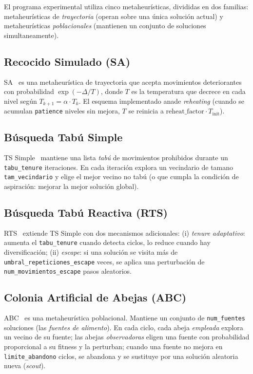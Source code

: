 El programa experimental utiliza cinco metaheurísticas, divididas en dos
familias: metaheurísticas de \emph{trayectoria} (operan sobre una única
solución actual) y metaheurísticas \emph{poblacionales} (mantienen un
conjunto de soluciones simultaneamente).

\subsection{Recocido Simulado (SA)}

SA~\cite{kirkpatrick1983} es una metaheurística de trayectoria que acepta
movimientos deteriorantes con probabilidad $\exp(-\Delta/T)$, donde $T$ es la
temperatura que decrece en cada nivel según
$T_{k+1} = \alpha \cdot T_k$. El esquema implementado anade
\emph{reheating} (cuando se acumulan \texttt{patience} niveles sin
mejora, $T$ se reinicia a $\text{reheat\_factor} \cdot T_{\text{init}}$).

\subsection{Búsqueda Tabú Simple}

TS Simple~\cite{glover1986, glover1997} mantiene una lista \emph{tabú} de movimientos prohibidos
durante un \texttt{tabu\_tenure} iteraciones. En cada iteración explora
un vecindario de tamano \texttt{tam\_vecindario} y elige el mejor vecino
no tabú (o que cumpla la condición de aspiración: mejorar la mejor
solución global).

\subsection{Búsqueda Tabú Reactiva (RTS)}

RTS~\cite{battiti1994} extiende TS Simple con dos mecanismos adicionales:
(i) \emph{tenure adaptativo}: aumenta el \texttt{tabu\_tenure} cuando
detecta ciclos, lo reduce cuando hay diversificación;
(ii) \emph{escape}: si una solución se visita más de
\texttt{umbral\_repeticiones\_escape} veces, se aplica una perturbación
de \texttt{num\_movimientos\_escape} pasos aleatorios.

\subsection{Colonia Artificial de Abejas (ABC)}

ABC~\cite{karaboga2005} es una metaheurística poblacional. Mantiene un conjunto de
\texttt{num\_fuentes} soluciones (las \emph{fuentes de alimento}). En
cada ciclo, cada abeja \emph{empleada} explora un vecino de su fuente;
las abejas \emph{observadoras} eligen una fuente con probabilidad
proporcional a su fitness y la perturban; cuando una fuente no mejora
en \texttt{limite\_abandono} ciclos, se abandona y se sustituye por una
solución aleatoria nueva (\emph{scout}).

